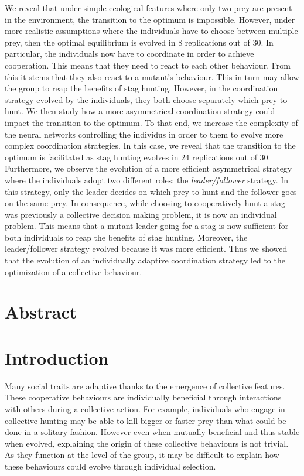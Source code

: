 We reveal that under simple ecological features where only two prey are present in the environment, the transition to the optimum is impossible. However, under more realistic assumptions where the individuals have to choose between multiple prey, then the optimal equilibrium is evolved in $8$ replications out of $30$. In particular, the individuals now have to coordinate in order to achieve cooperation. This means that they need to react to each other behaviour. From this it stems that they also react to a mutant's behaviour. This in turn may allow the group to reap the benefits of stag hunting. 
However, in the coordination strategy evolved by the individuals, they both choose separately which prey to hunt. We then study how a more asymmetrical coordination strategy could impact the transition to the optimum. To that end, we increase the complexity of the neural networks controlling the individus in order to them to evolve more complex coordination strategies. In this case, we reveal that the transition to the optimum is facilitated as stag hunting evolves in $24$ replications out of $30$. Furthermore, we observe the evolution of a more efficient asymmetrical strategy where the individuals adopt two different roles: the \emph{leader/follower} strategy. In this strategy, only the leader decides on which prey to hunt and the follower goes on the same prey. In consequence, while choosing to cooperatively hunt a stag was previously a collective decision making problem, it is now an individual problem. This means that a mutant leader going for a stag is now sufficient for both individuals to reap the benefits of stag hunting. Moreover, the leader/follower strategy evolved because it was more efficient. Thus we showed that the evolution of an individually adaptive coordination strategy led to the optimization of a collective behaviour.

\clearpage



\section{Abstract}


\section{Introduction}
  Many social traits are adaptive thanks to the emergence of collective features. These cooperative behaviours are individually beneficial through interactions with others during a collective action. For example, individuals who engage in collective hunting may be able to kill bigger or faster prey than what could be done in a solitary fashion. However even when mutually beneficial and thus stable when evolved, explaining the origin of these collective behaviours is not trivial. As they function at the level of the group, it may be difficult to explain how these behaviours could evolve through individual selection.


